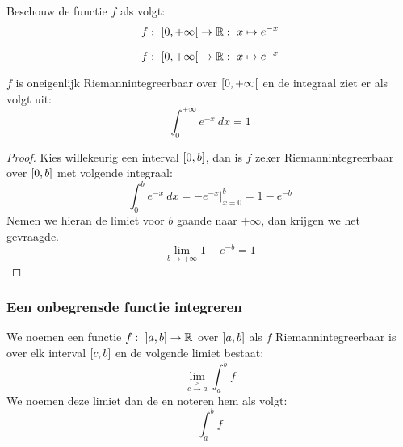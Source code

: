 \documentclass[main.tex]{subfiles}
\begin{document}
\begin{vb}
  Beschouw de functie $f$ als volgt:
  \[ f:\ \interval[open right]{0}{+\infty} \rightarrow \mathbb{R}:\ x \mapsto e^{-x}\]

  \noindent
  \begin{minipage}{.45\textwidth}
    \begin{figure}[H]
      \centering
    \end{figure}
  \end{minipage}
  \begin{minipage}{.45\textwidth}
    \[ f:\ \interval[open right]{0}{+\infty} \rightarrow \mathbb{R}:\ x \mapsto e^{-x}\]
  \end{minipage}

  $f$ is oneigenlijk Riemannintegreerbaar over $\interval[open right]{0}{+\infty}$ en de integraal ziet er als volgt uit:
  \[ \int_{0}^{+\infty}e^{-x}\ dx = 1 \]

  \begin{proof}
    Kies willekeurig een interval $\interval{0}{b}$, dan is $f$ zeker Riemannintegreerbaar over $\interval{0}{b}$ met volgende integraal:
    \[ \int_{0}^{b}e^{-x}\ dx = -e^{-x}\big|_{x=0}^{b} = 1-e^{-b}\]
    Nemen we hieran de limiet voor $b$ gaande naar $+\infty$, dan krijgen we het gevraagde.
    \[ \lim_{b\rightarrow +\infty}1-e^{-b} = 1 \]
  \end{proof}
\end{vb}

\subsubsection{Een onbegrensde functie integreren}
\label{sec:een-onbegr-funct}

\begin{de}
  We noemen een functie $f:\ \interval[open left]{a}{b} \rightarrow \mathbb{R}$   over $\interval[open left]{a}{b}$ als $f$ Riemannintegreerbaar is over elk interval $\interval{c}{b}$ en de volgende limiet bestaat:
  \[ \lim_{c\overset{>}{\rightarrow} a}\int_{a}^{b}f \]
  We noemen deze limiet dan de  en noteren hem als volgt:
  \[ \int_{a}^{b}f \]
\end{de}
\end{document}
